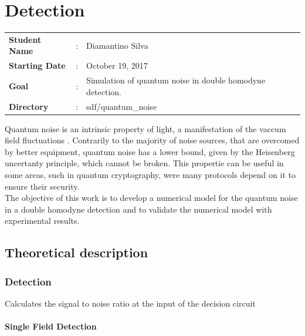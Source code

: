 \clearpage
\section{Detection}

\begin{tcolorbox}	
\begin{tabular}{p{2.75cm} p{0.2cm} p{10.5cm}}
\textbf{Student Name}  &:& Diamantino Silva\\
\textbf{Starting Date} &:& October 19, 2017\\
\textbf{Goal}          &:& Simulation of quantum noise in double homodyne detection.\\
\textbf{Directory}     &:& sdf/quantum\_noise
\end{tabular}
\end{tcolorbox}
%
\vspace{2em}
%
Quantum noise is an intrinsic property of light, a manifestation of the vaccum field fluctuations
\cite{fox2006}.
Contrarily to the majority of noise sources, that are overcomed by better equipment, quantum noise has a lower bound, given by the Heisenberg uncertanty principle, which cannot be broken. This propertie can be useful in some areas, such in quantum cryptography, were many protocols depend on it to ensure their security.\\
The objective of this work is to develop a numerical model for the quantum noise in a double homodyne detection and to validate the numerical model with experimental results.\\


\subsection{Theoretical description}\label{sec:intro}

\subsubsection{Detection}

Calculates the signal to noise ratio at the input of the decision circuit

\paragraph{Single Field Detection}


